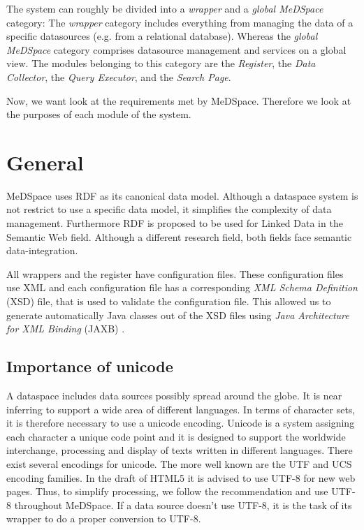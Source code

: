 The system can roughly be divided into a \emph{wrapper} and a \emph{global MeDSpace} category: The \emph{wrapper} category includes everything from managing the data of a specific datasources (e.g. from a relational database). 
Whereas the \emph{global MeDSpace} category comprises datasource management and services on a global view.  The modules belonging to this category are the \emph{Register}, the \emph{Data Collector}, the \emph{Query Executor}, and the \emph{Search Page}.  

Now, we want look at the requirements met by MeDSpace. Therefore we look at the purposes of each module of the system.

\section{General} 
MeDSpace uses RDF \cite{w3RDF} as its canonical data model. Although a dataspace system is not restrict to use a specific data model, it simplifies the complexity of data management.
Furthermore RDF is proposed to be used for Linked Data \cite{LinkedData} in the Semantic Web field. Although a different research field, both fields face semantic data-integration.

All wrappers and the register have configuration files. These configuration files use XML and each configuration file has a corresponding \emph{XML Schema Definition} (XSD)\cite{w3XMLSchema} file, that is used to validate the configuration file. This allowed us to generate automatically Java classes out of the XSD files using \emph{Java Architecture for XML Binding} (JAXB) \cite{JAXB}.


\subsection{Importance of unicode}

A dataspace includes data sources possibly spread around the globe. It is near inferring to support a wide area of different languages. In terms of character sets, it is therefore necessary to use a unicode encoding.
Unicode is a system assigning each character a unique code point and it is designed to support the worldwide interchange, processing and display of texts written in different languages\cite{UnicodeStandard}.\newline
There exist several encodings for unicode. The more well known are the UTF and UCS encoding families. In the draft of HTML5 it is advised to use UTF-8 for new web pages\cite{HTML5Rec}. 
Thus, to simplify processing, we follow the recommendation and use UTF-8 throughout MeDSpace. If a data source doesn't use UTF-8, it is the task of its wrapper to do a proper conversion to UTF-8.

